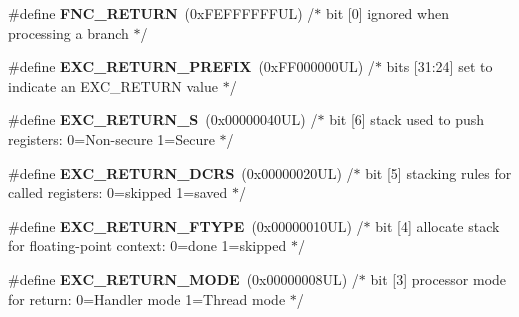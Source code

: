 \begin{DoxyCompactItemize}
\#define {\bfseries F\+N\+C\+\_\+\+R\+E\+T\+U\+RN}~(0x\+F\+E\+F\+F\+F\+F\+F\+F\+U\+L)     /$\ast$ bit \mbox{[}0\mbox{]} ignored when processing a branch                             $\ast$/
\item 
\mbox{\label{group___c_m_s_i_s___core___n_v_i_c_functions_ga99e0c1c19f050880a8bd827a7f420bec}} 
\#define {\bfseries E\+X\+C\+\_\+\+R\+E\+T\+U\+R\+N\+\_\+\+P\+R\+E\+F\+IX}~(0x\+F\+F000000\+U\+L)     /$\ast$ bits \mbox{[}31\+:24\mbox{]} set to indicate an E\+X\+C\+\_\+\+R\+E\+T\+U\+R\+N value                     $\ast$/
\item 
\mbox{\label{group___c_m_s_i_s___core___n_v_i_c_functions_ga88711355d0196b1ffeb18c33e2c95360}} 
\#define {\bfseries E\+X\+C\+\_\+\+R\+E\+T\+U\+R\+N\+\_\+S}~(0x00000040\+U\+L)     /$\ast$ bit \mbox{[}6\mbox{]} stack used to push registers\+: 0=\+Non-\/secure 1=\+Secure          $\ast$/
\item 
\mbox{\label{group___c_m_s_i_s___core___n_v_i_c_functions_ga0a0f2c03b4aef2c02bdae044bda1324b}} 
\#define {\bfseries E\+X\+C\+\_\+\+R\+E\+T\+U\+R\+N\+\_\+\+D\+C\+RS}~(0x00000020\+U\+L)     /$\ast$ bit \mbox{[}5\mbox{]} stacking rules for called registers\+: 0=skipped 1=saved       $\ast$/
\item 
\mbox{\label{group___c_m_s_i_s___core___n_v_i_c_functions_ga342b51c3eec59822bf206e24ef881a9e}} 
\#define {\bfseries E\+X\+C\+\_\+\+R\+E\+T\+U\+R\+N\+\_\+\+F\+T\+Y\+PE}~(0x00000010\+U\+L)     /$\ast$ bit \mbox{[}4\mbox{]} allocate stack for floating-\/point context\+: 0=done 1=skipped  $\ast$/
\item 
\mbox{\label{group___c_m_s_i_s___core___n_v_i_c_functions_gabb65f847769a7807395b2739cc9702d0}} 
\#define {\bfseries E\+X\+C\+\_\+\+R\+E\+T\+U\+R\+N\+\_\+\+M\+O\+DE}~(0x00000008\+U\+L)     /$\ast$ bit \mbox{[}3\mbox{]} processor mode for return\+: 0=\+Handler mode 1=\+Thread mode      $\ast$/
\item 
\mbox{\label{group___c_m_s_i_s___core___n_v_i_c_functions_ga686922b26c29eac540f53a6213627466}} 

\end{DoxyCompactItemize}
